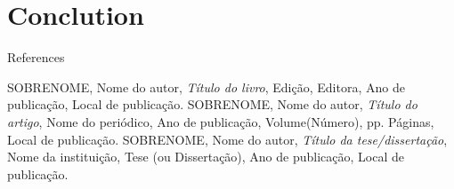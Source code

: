 \section{Conclution} %

\begin{frame}{References}
    \footnotesize
    \begin{thebibliography}{99}
         SOBRENOME, Nome do autor, \textit{Título do livro}, Edição, Editora, Ano de publicação, Local de publicação.
         SOBRENOME, Nome do autor, \textit{Título do artigo}, Nome do periódico, Ano de publicação, Volume(Número), pp. Páginas, Local de publicação.
         SOBRENOME, Nome do autor, \textit{Título da tese/dissertação}, Nome da instituição, Tese (ou Dissertação), Ano de publicação, Local de publicação.
    \end{thebibliography}
\end{frame}
